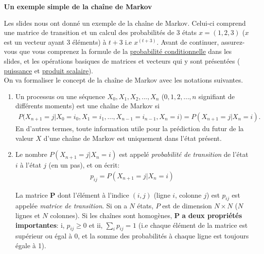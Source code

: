 \begin{Exercice}[15 minutes]\textbf{Un exemple simple de la chaîne de Markov}

Les slides nous ont donné un exemple de la chaîne de Markov. Celui-ci comprend une matrice de transition et un calcul des probabilités de  3 états $x=(1,2,3)$ ($x$ est un vecteur ayant 3 éléments) à $t+3$  i.e $x^{(t+3)}$. Avant de continuer, assurez-vous que vous comprenez la formule de la \href{https://fr.wikipedia.org/wiki/Probabilit\%C3\%A9_conditionnelle}{\color{cyan} probabilité conditionnelle} dans les slides, et les opérations basiques de matrices et vecteurs qui y sont présentées (\href{https://fr.wikiversity.org/wiki/Initiation_aux_matrices/Puissance_d\%27une_matrice}{\color{cyan} puissance} et \href{https://fr.wikipedia.org/wiki/Produit_scalaire}{\color{cyan} produit scalaire}).\\

On va formaliser le concept de la chaîne de Markov avec les notations suivantes.\\
\begin{enumerate}
    \item Un processus ou une séquence $X_0, X_1, X_2, ..., X_n$ ($0,1,2,...,n$ signifiant de différents moments) est une chaîne de Markov si
    \begin{align} 
    P\Big(X_{n+1}=j | X_0=i_0, X_1=i_1, ... , X_{n-1}=i_{n-1},X_n=i\Big) = P\left(X_{n+1}=j | X_n=i\right).
    \end{align}
    En d'autres termes, toute information utile pour la prédiction du futur de la valeur $X$ d'une chaîne de Markov est uniquement dans l'état présent.
     
\item  Le nombre $P\left(X_{n+1}=j | X_n=i\right)$ est appelé \textit{probabilité de transition} de l'état $i$ à l'état $j$ (en un pas), et on écrit:
\begin{align}
p_{ij} = P\left(X_{n+1}=j | X_n=i\right)
\end{align}

La matrice $\mathbf{P}$ dont l'élément à l'indice $(i,j)$ (ligne $i$, colonne $j$) est $p_{ij}$ est appelée \textit{matrice de transition}. Si on a $N$ états, $P$ est de dimension $N \times N$ ($N$ lignes et $N$ colonnes). Si les chaînes sont homogènes, $\mathbf{P}$ \textbf{a deux propriétés importantes}: i, $p_{ij} \geq 0$ et ii, $\sum_i p_{ij} = 1$ (i.e chaque élément de la matrice est supérieur ou égal à 0, et la somme des probabilités à chaque ligne est toujours égale à 1).


\end{enumerate}
\end{Exercice}
